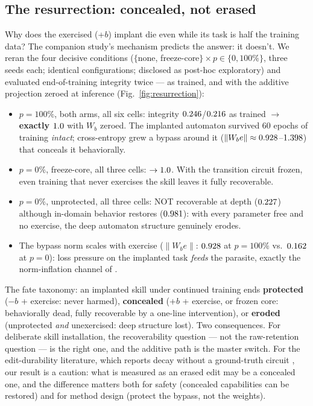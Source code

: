 \documentclass[10pt]{article}
\begin{document}
\subsection{The resurrection: concealed, not erased}\label{sec:resurrection}
Why does the exercised (+$b$) implant die even while its task is half the training data? The
companion study's mechanism predicts the answer: it doesn't. We reran the four decisive
conditions ($\{$none, freeze-core$\}\times p\in\{0,100\%\}$, three seeds each; identical
configurations; disclosed as post-hoc exploratory) and evaluated end-of-training integrity twice
--- as trained, and with the additive projection zeroed at inference
(Fig.~\ref{fig:resurrection}):

\begin{itemize}
\item $p{=}100\%$, both arms, all six cells: integrity
$0.246$/$0.216$ as trained $\to$ \textbf{exactly
$1.0$} with $W_b$ zeroed. The implanted automaton survived $60$ epochs of
training \emph{intact}; cross-entropy grew a bypass around it ($\|W_b e\|\approx
0.928$--$1.398$) that conceals it behaviorally.
\item $p{=}0\%$, freeze-core, all three cells: $\to1.0$. With the transition
circuit frozen, even training that never exercises the skill leaves it fully recoverable.
\item $p{=}0\%$, unprotected, all three cells: NOT recoverable at depth
($0.227$) although in-domain behavior restores ($0.981$): with
every parameter free and no exercise, the deep automaton structure genuinely erodes.
\item The bypass norm scales with exercise ($\|W_b e\|$: $0.928$ at $p{=}100\%$
vs.\ $0.162$ at $p{=}0$): loss pressure on the implanted task \emph{feeds} the
parasite, exactly the norm-inflation channel of \citet{howe2026automaton}.
\end{itemize}

The fate taxonomy: an implanted skill under continued training ends \textbf{protected} ($-b$ +
exercise: never harmed), \textbf{concealed} (+$b$ + exercise, or frozen core: behaviorally dead,
fully recoverable by a one-line intervention), or \textbf{eroded} (unprotected \emph{and}
unexercised: deep structure lost). Two consequences. For deliberate skill installation, the
recoverability question --- not the raw-retention question --- is the right one, and the additive
path is the master switch. For the edit-durability literature, which reports decay without a
ground-truth circuit \citep{cheng2025erase,wen2025retention}, our result is a caution: what is
measured as an erased edit may be a concealed one, and the difference matters both for safety
(concealed capabilities can be restored) and for method design (protect the bypass, not the
weights).
\end{document}
